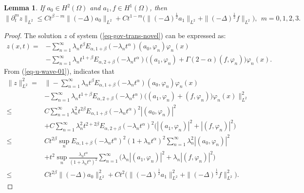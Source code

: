 \documentclass[11pt]{article}
\newtheorem{lemma}{Lemma}[section]
\numberwithin{equation}{section}
\begin{document}
\begin{lemma}\label{thm-reg-L2-z}
If $a_0\in H^2(\Omega)$ and $a_1,f\in H^1(\Omega)$, then
\[ \|\partial_t^mz\|_{L^2}\le Ct^{\beta-m} \|(-\Delta)a_0\|_{L^2}+Ct^{1-m}\Big(\|(-\Delta)^{\frac12}a_1\|_{L^2}+\|(-\Delta)^{\frac12}f\|_{L^2}\Big),~~m=0,1,2,3. \]
\end{lemma}
\begin{proof}
The solution $z$ of system (\ref{eq-gov-trans-novel}) can be expressed as:
\begin{align}\nonumber
z(x,t) =& -\sum_{n=1}^{\infty} \lambda_n t^{\beta}  E_{\alpha, 1+\beta}(-\lambda_n t^\alpha)(a_0, \varphi_n)\varphi_n(x) \\\label{solution-z}
&-\sum_{n=1}^{\infty}\lambda_nt^{1+\beta} E_{\alpha, 2+\beta}(-\lambda_n t^\alpha)\big( (a_1, \varphi_n) + \Gamma(2-\alpha) (f, \varphi_n) \big)\varphi_n(x).    
\end{align}
From (\ref{eq-u-wave-01}), indicates that 
\begin{align*}
\|z\|_{L^2}^2
=&\bigg\|-\sum_{n=1}^{\infty}\lambda_n t^{\beta}E_{\alpha,1+\beta}(-\lambda_n t^\alpha)(a_0, \varphi_n)\varphi_n(x)\\ 
&-\sum_{n=1}^{\infty}\lambda_nt^{1+\beta}E_{\alpha,2+\beta}(-\lambda_n t^\alpha)\Big((a_1, \varphi_n)+(f, \varphi_n)\Big)\varphi_n(x)\bigg\|_{L^2}^2\\ 
\le&C\sum_{n=1}^{\infty}\lambda_n^2t^{2\beta}E_{\alpha,1+\beta}(-\lambda_n t^\alpha)^2|(a_0, \varphi_n)|^2\\ &+C\sum_{n=1}^{\infty}\lambda_n^2t^{2+2\beta}E_{\alpha,2+\beta}(-\lambda_n t^\alpha)^2\Big(|(a_1, \varphi_n)|^2+|(f,\varphi_n)|^2\Big)\\
\le&Ct^{2\beta}\sup_nE_{\alpha,1+\beta}(-\lambda_n t^\alpha)^2{(1+\lambda_nt^\alpha)^2}\sum_{n=1}^\infty \lambda_n^{2}|(a_0, \varphi_n)|^2\\
&+t^{2}\sup_n\frac{\lambda_nt^{\alpha}}{(1+\lambda_nt^\alpha)^2}\sum_{n=1}^{\infty}\Big(\lambda_n|(a_1, \varphi_n)|^2+\lambda_n|(f, \varphi_n)|^2\Big)\\
\le&Ct^{2\beta} \|(-\Delta)a_0\|_{L^2}^2+Ct^{2}\Big(\|(-\Delta)^{\frac12}a_1\|_{L^2}^2+\|(-\Delta)^{\frac12}f\|_{L^2}^2\Big). 
\end{align*} 


\end{proof}
\end{document}
